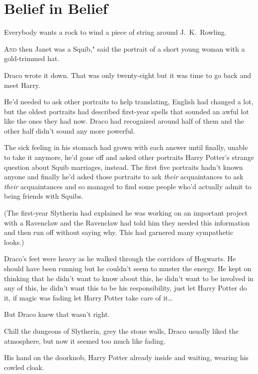 \chapter{Belief in Belief}

\begin{chapterOpeningAuthorNote}
Everybody wants a rock to wind a piece of string around J.~K.~Rowling.
\end{chapterOpeningAuthorNote}

\lettrine[ante=``]{A}{nd} then Janet was a Squib," said the portrait of a short young woman with a gold-trimmed hat.

Draco wrote it down. That was only twenty-eight but it was time to go back and meet Harry.

He'd needed to ask other portraits to help translating, English had changed a lot, but the oldest portraits had described first-year spells that sounded an awful lot like the ones they had now. Draco had recognized around half of them and the other half didn't sound any more powerful.

The sick feeling in his stomach had grown with each answer until finally, unable to take it anymore, he'd gone off and asked other portraits Harry Potter's strange question about Squib marriages, instead. The first five portraits hadn't known anyone and finally he'd asked those portraits to ask \emph{their} acquaintances to ask \emph{their} acquaintances and so managed to find some people who'd actually admit to being friends with Squibs.

(The first-year Slytherin had explained he was working on an important project with a Ravenclaw and the Ravenclaw had told him they needed this information and then run off without saying why. This had garnered many sympathetic looks.)

Draco's feet were heavy as he walked through the corridors of Hogwarts. He should have been running but he couldn't seem to muster the energy. He kept on thinking that he didn't want to know about this, he didn't want to be involved in any of this, he didn't want this to be his responsibility, just let Harry Potter do it, if magic was fading let Harry Potter take care of it{\ldots}

But Draco knew that wasn't right.

Chill the dungeons of Slytherin, grey the stone walls, Draco usually liked the atmosphere, but now it seemed too much like fading.

His hand on the doorknob, Harry Potter already inside and waiting, wearing his cowled cloak.

